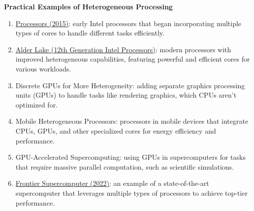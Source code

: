 \highspace
\begin{flushleft}
    \textcolor{Green3}{ \textbf{Practical Examples of Heterogeneous Processing}}
\end{flushleft}
\begin{enumerate}
    \item \href{https://en.wikipedia.org/wiki/Skylake_(microarchitecture)}{ Processors (2015)}: early Intel processors that began incorporating multiple types of cores to handle different tasks efficiently.
 
    \item \href{https://en.wikipedia.org/wiki/Alder_Lake}{Alder Lake (12th Generation Intel Processors)}: modern processors with improved heterogeneous capabilities, featuring powerful and efficient cores for various workloads.
 
    \item Discrete GPUs for More Heterogeneity: adding separate graphics processing units (GPUs) to handle tasks like rendering graphics, which CPUs aren't optimized for.
 
    \item Mobile Heterogeneous Processors: processors in mobile devices that integrate CPUs, GPUs, and other specialized cores for energy efficiency and performance.
 
    \item GPU-Accelerated Supercomputing: using GPUs in supercomputers for tasks that require massive parallel computation, such as scientific simulations.
 
    \item \href{https://en.wikipedia.org/wiki/Frontier_(supercomputer)}{Frontier Supercomputer (2022)}: an example of a state-of-the-art supercomputer that leverages multiple types of processors to achieve top-tier performance.
\end{enumerate}
